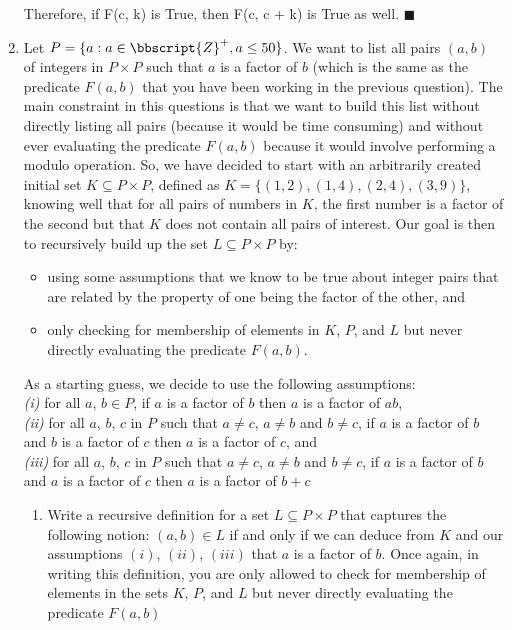\documentclass[12pt, oneside]{article}
\begin{document}
\begin{enumerate}
Therefore, if F(c, k) is True, then F(c, c + k) is True as well.
\hfill $\blacksquare$

\pagebreak
\item Let $P = \{a: a\in \bbscript{Z}^+, a \leq 50 \}$. We want
to list all pairs $(a, b)$ of integers in $P\times P$ such that
$a$ is a factor of $b$ (which is the same as the predicate $F(a,
b)$ that you have been working in the previous question).
The main constraint in this questions is that we want to build
this list without directly listing all pairs (because it would be
time consuming) and without ever evaluating the predicate $F(a,
b)$ because it would involve performing a modulo operation. So,
we have decided to start with an arbitrarily created initial set
$K \subseteq P \times P$, defined as $K = \{(1,2), (1, 4), (2,4),
(3,9)\}$, knowing well that for all pairs of numbers in $K$, the
first number is a factor of the second but that $K$ does not
contain all pairs of interest. Our goal is then to recursively
build up the set $L \subseteq P \times P$ by:
\begin{itemize}
\item using some assumptions that we know to be true about
integer pairs that are related by the property of one being the
factor of the other, and
\item only checking for membership of elements in $K$, $P$,
and $L$ but never directly evaluating the predicate $F(a, b)$.
\end{itemize}
As a starting guess, we decide to use the following
assumptions:\\
{\em (i)} for all $a$, $b \in P$, if $a$ is a factor of $b$ then
$a$ is a factor of $ab$,\\ {\em (ii)} for all $a$, $b$, $c$ in
$P$ such that $a \neq c$, $a\neq b$ and $b \neq c$, if $a$ is a
factor of $b$ and $b$ is a factor of $c$ then $a$ is a factor of
$c$, and \\{\em (iii)} for all $a$, $b$, $c$ in $P$ such that
$a \neq c$, $a\neq b$ and $b \neq c$, if $a$ is a factor of $b$
and $a$ is a factor of $c$ then $a$ is a factor of $b+c$\\
\begin{enumerate}
\item\label{rec_set} Write a recursive definition for a set $L \subseteq P \times P$ that captures the following notion: $(a,
b) \in L$ if and only if we can deduce from $K$ and our
assumptions $(i)$, $(ii)$, $(iii)$ that $a$ is a factor of $b$.
Once again, in writing this definition, you are only allowed to
check for membership of elements in the sets $K$, $P$, and $L$
but never directly evaluating the predicate $F(a, b)$


\end{enumerate}
\end{enumerate}
\end{document}
